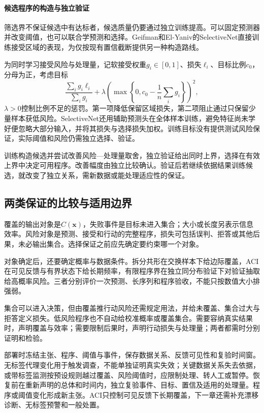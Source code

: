 \paragraph{候选程序的构造与独立验证}

筛选界不保证候选中有达标者，候选质量仍要通过独立训练提高。可以固定预测器并改变阈值，也可以联合学预测和选择。Geifman和El-Yaniv的SelectiveNet直接训练接受区域的表现，为仅按现有置信截断提供另一种构造路线。

为同时学习接受风险与处理量，记软接受权重$g_i\in[0,1]$、损失$\ell_i$、目标比例$c_0$，分母为正，考虑目标
\begin{equation}
 \frac{\sum_i g_i\ell_i}{\sum_i g_i}
 +\lambda\left(\max\left\{0,c_0-\frac1n\sum_i g_i\right\}\right)^2,
 \label{eq:reliability-selective-training}
\end{equation}
$\lambda>0$控制比例不足的惩罚。第一项降低保留区域损失，第二项阻止通过只保留少量样本获低风险。SelectiveNet还用辅助预测头在全体样本训练，避免特征尚未学好便忽略大部分输入，并将其损失与选择损失加权。训练目标没有提供测试风险保证，实际阈值和风险仍需独立选择、验证。

训练构造候选并尝试改善风险—处理量取舍，独立验证给出同时上界，选择在有效上界中决定可用程序。改善幅度由独立比较确认。验证后若继续依据结果训练候选，就改变了独立关系，需新数据或能处理适应性的保证。

\subsection{两类保证的比较与适用边界}

覆盖的输出对象是$C(\bm{x})$，失败事件是目标未进入集合；大小或长度另表示信息效率。风险对象是预测、接受和行动的完整程序，损失可包括误判、拒答或其他后果，未必输出集合。选择保证之前应先确定要约束哪一个对象。

对象确定后，还要确定概率与数据条件。拆分共形在交换样本下给边际覆盖，ACI在可见反馈与有界状态下给长期频率，有限程序界在独立同分布验证下对验证抽取给高概率风险。三者分别评价一次预测、长序列和程序验收，不能只按数值大小排强弱。

集合可以进入决策，但由覆盖推行动风险还需规定用法，并给未覆盖、集合过大与拒答定义损失。低风险程序也不自动给校准概率或覆盖集合。需要容纳真实结果时，声明覆盖与效率；需要限制后果时，声明行动损失与处理量；两者都需时分别证明和检验。

部署时冻结主张、程序、阈值与事件，保存数据关系、反馈可见性和复验时间窗。无标签代理变化用于触发调查，不能单独证明真实失效；关键数据关系失去依据，或带标签监测按预设规则越过覆盖、风险阈值时，应限制处理、转人工或暂停。恢复前在重新声明的总体和时间内，独立复验事件、目标、置信及适用的处理量。程序或阈值变化形成新主张。ACI只控制可见反馈下长期覆盖，下一章还需补充漂移诊断、无标签预警和一般处置。

